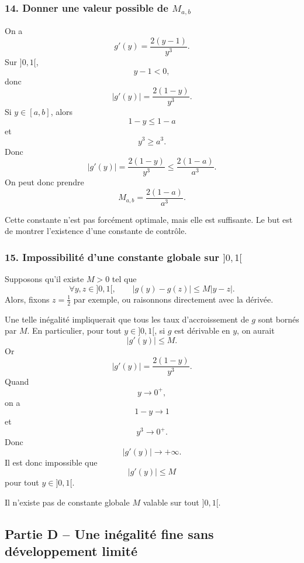 \documentclass[11pt,a4paper]{article}
\begin{document}

\subsubsection*{14. Donner une valeur possible de \(M_{a,b}\)}

On a
\[
g'(y)=\frac{2(y-1)}{y^3}.
\]
Sur \(]0,1[\),
\[
y-1<0,
\]
donc
\[
|g'(y)|=\frac{2(1-y)}{y^3}.
\]
Si \(y\in[a,b]\), alors
\[
1-y\leq 1-a
\]
et
\[
y^3\geq a^3.
\]
Donc
\[
|g'(y)|
=
\frac{2(1-y)}{y^3}
\leq
\frac{2(1-a)}{a^3}.
\]
On peut donc prendre
\[
M_{a,b}=\frac{2(1-a)}{a^3}.
\]

\begin{remarquebox}
Cette constante n'est pas forcément optimale, mais elle est suffisante. Le but est de montrer l'existence d'une constante de contrôle.
\end{remarquebox}


\subsubsection*{15. Impossibilité d'une constante globale sur \(]0,1[\)}

Supposons qu'il existe \(M>0\) tel que
\[
\forall y,z\in]0,1[,
\qquad
|g(y)-g(z)|\leq M|y-z|.
\]
Alors, fixons \(z=\frac12\) par exemple, ou raisonnons directement avec la dérivée.

Une telle inégalité impliquerait que tous les taux d'accroissement de \(g\) sont bornés par \(M\). En particulier, pour tout \(y\in]0,1[\), si \(g\) est dérivable en \(y\), on aurait
\[
|g'(y)|\leq M.
\]
Or
\[
|g'(y)|=\frac{2(1-y)}{y^3}.
\]
Quand
\[
y\to0^+,
\]
on a
\[
1-y\to1
\]
et
\[
y^3\to0^+.
\]
Donc
\[
|g'(y)|\to+\infty.
\]
Il est donc impossible que
\[
|g'(y)|\leq M
\]
pour tout \(y\in]0,1[\).

\begin{resultatbox}
Il n'existe pas de constante globale \(M\) valable sur tout \(]0,1[\).
\end{resultatbox}


\subsection*{Partie D -- Une inégalité fine sans développement limité}
\end{document}
